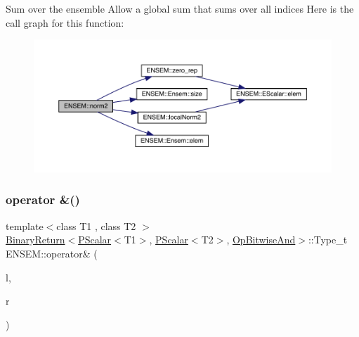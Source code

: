 Sum over the ensemble Allow a global sum that sums over all indices Here is the call graph for this function\+:\nopagebreak
\begin{figure}[H]
\begin{center}
\leavevmode
\includegraphics[width=350pt]{d2/d94/namespaceENSEM_a67904e4929712a1fa81e70ed7980c05b_cgraph}
\end{center}
\end{figure}
\mbox{\label{namespaceENSEM_gadbbb42ee94a77c2df59c5a4cf78fddeb}} 
\subsubsection{\texorpdfstring{operator \&()}{operator \&()}\hspace{0.1cm}{\footnotesize\ttfamily [1/7]}}
{\footnotesize\ttfamily template$<$class T1 , class T2 $>$ \\
\mbox{\hyperlink{structENSEM_1_1BinaryReturn}{Binary\+Return}}$<$\mbox{\hyperlink{classENSEM_1_1PScalar}{P\+Scalar}}$<$T1$>$, \mbox{\hyperlink{classENSEM_1_1PScalar}{P\+Scalar}}$<$T2$>$, \mbox{\hyperlink{structENSEM_1_1OpBitwiseAnd}{Op\+Bitwise\+And}}$>$\+::Type\+\_\+t E\+N\+S\+E\+M\+::operator\& (\begin{DoxyParamCaption}\item[{const \mbox{\hyperlink{classENSEM_1_1PScalar}{P\+Scalar}}$<$ T1 $>$ \&}]{l,  }\item[{const \mbox{\hyperlink{classENSEM_1_1PScalar}{P\+Scalar}}$<$ T2 $>$ \&}]{r }\end{DoxyParamCaption})\hspace{0.3cm}{\ttfamily [inline]}}

\mbox{\label{namespaceENSEM_ga0ce8b28e6efb00e905152096020cfafe}} 
